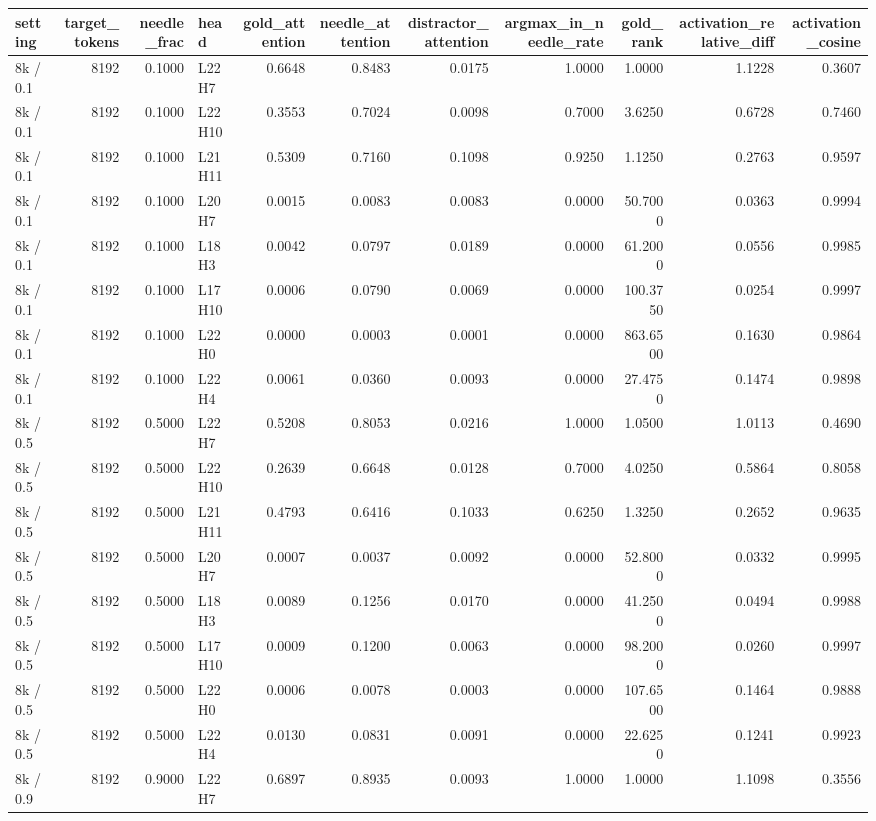 \begin{tabular}{lrrlrrrrrrr}
\toprule
setting & target_tokens & needle_frac & head & gold_attention & needle_attention & distractor_attention & argmax_in_needle_rate & gold_rank & activation_relative_diff & activation_cosine \\
\midrule
8k / 0.1 & 8192 & 0.1000 & L22H7 & 0.6648 & 0.8483 & 0.0175 & 1.0000 & 1.0000 & 1.1228 & 0.3607 \\
8k / 0.1 & 8192 & 0.1000 & L22H10 & 0.3553 & 0.7024 & 0.0098 & 0.7000 & 3.6250 & 0.6728 & 0.7460 \\
8k / 0.1 & 8192 & 0.1000 & L21H11 & 0.5309 & 0.7160 & 0.1098 & 0.9250 & 1.1250 & 0.2763 & 0.9597 \\
8k / 0.1 & 8192 & 0.1000 & L20H7 & 0.0015 & 0.0083 & 0.0083 & 0.0000 & 50.7000 & 0.0363 & 0.9994 \\
8k / 0.1 & 8192 & 0.1000 & L18H3 & 0.0042 & 0.0797 & 0.0189 & 0.0000 & 61.2000 & 0.0556 & 0.9985 \\
8k / 0.1 & 8192 & 0.1000 & L17H10 & 0.0006 & 0.0790 & 0.0069 & 0.0000 & 100.3750 & 0.0254 & 0.9997 \\
8k / 0.1 & 8192 & 0.1000 & L22H0 & 0.0000 & 0.0003 & 0.0001 & 0.0000 & 863.6500 & 0.1630 & 0.9864 \\
8k / 0.1 & 8192 & 0.1000 & L22H4 & 0.0061 & 0.0360 & 0.0093 & 0.0000 & 27.4750 & 0.1474 & 0.9898 \\
8k / 0.5 & 8192 & 0.5000 & L22H7 & 0.5208 & 0.8053 & 0.0216 & 1.0000 & 1.0500 & 1.0113 & 0.4690 \\
8k / 0.5 & 8192 & 0.5000 & L22H10 & 0.2639 & 0.6648 & 0.0128 & 0.7000 & 4.0250 & 0.5864 & 0.8058 \\
8k / 0.5 & 8192 & 0.5000 & L21H11 & 0.4793 & 0.6416 & 0.1033 & 0.6250 & 1.3250 & 0.2652 & 0.9635 \\
8k / 0.5 & 8192 & 0.5000 & L20H7 & 0.0007 & 0.0037 & 0.0092 & 0.0000 & 52.8000 & 0.0332 & 0.9995 \\
8k / 0.5 & 8192 & 0.5000 & L18H3 & 0.0089 & 0.1256 & 0.0170 & 0.0000 & 41.2500 & 0.0494 & 0.9988 \\
8k / 0.5 & 8192 & 0.5000 & L17H10 & 0.0009 & 0.1200 & 0.0063 & 0.0000 & 98.2000 & 0.0260 & 0.9997 \\
8k / 0.5 & 8192 & 0.5000 & L22H0 & 0.0006 & 0.0078 & 0.0003 & 0.0000 & 107.6500 & 0.1464 & 0.9888 \\
8k / 0.5 & 8192 & 0.5000 & L22H4 & 0.0130 & 0.0831 & 0.0091 & 0.0000 & 22.6250 & 0.1241 & 0.9923 \\
8k / 0.9 & 8192 & 0.9000 & L22H7 & 0.6897 & 0.8935 & 0.0093 & 1.0000 & 1.0000 & 1.1098 & 0.3556 \\

\end{tabular}
